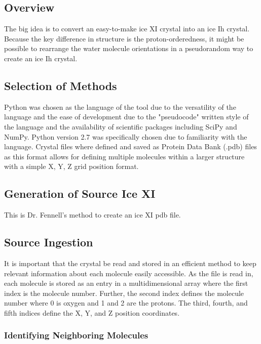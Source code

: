 \subsection{Overview}

The big idea is to convert an easy-to-make ice XI crystal into an ice Ih crystal.
Because the key difference in structure is the proton-orderedness, it might be possible to rearrange the water molecule orientations in a pseudorandom way to create an ice Ih crystal.

\subsection{Selection of Methods}

Python was chosen as the language of the tool due to the versatility of the language and the ease of development due to the "pseudocode" written style of the language and the availability of scientific packages including SciPy and NumPy. 
Python version 2.7 was specifically chosen due to familiarity with the language.
Crystal files where defined and saved as Protein Data Bank (.pdb) files as this format allows for defining multiple molecules within a larger structure with a simple X, Y, Z grid position format. 

\subsection{Generation of Source Ice XI}

This is Dr. Fennell's method to create an ice XI pdb file.

\subsection{Source Ingestion}

It is important that the crystal be read and stored in an efficient method to keep relevant information about each molecule easily accessible. 
As the file is read in, each molecule is stored as an entry in a multidimensional array where the first index is the molecule number. 
Further, the second index defines the molecule number where 0 is oxygen and 1 and 2 are the protons. 
The third, fourth, and fifth indices define the X, Y, and Z position coordinates. 

\subsubsection{Identifying Neighboring Molecules}

